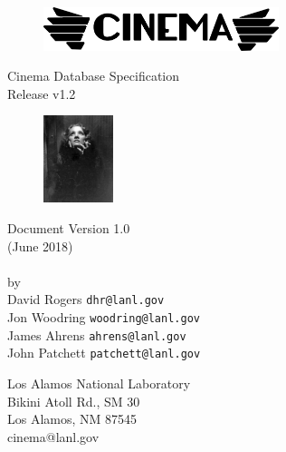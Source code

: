 \thispagestyle{empty}

\begin{ttfamily}
\begin{center}
 \ \ \\
\vspace{1.0 in}
\begin{figure}[h!]
\centering
\includegraphics[height=0.5in]{img/cinema_logo_name}
\end{figure}
\vspace{1.0 in}
Cinema Database Specification \\
\dietrich Release v1.2\\
\bigskip
\begin{figure}[h!]
\centering
\includegraphics[height=1.0in]{img/dietrich_spec_logo}
\end{figure}
\bigskip
Document Version 1.0 \\
(June 2018)\\
\LAUR\\
\bigskip
\bigskip
\bigskip
\bigskip
by \\
\bigskip
David Rogers  \texttt{\small dhr@lanl.gov}\\
Jon Woodring  \texttt{\small woodring@lanl.gov}\\
James Ahrens  \texttt{\small ahrens@lanl.gov}\\
John Patchett \texttt{\small patchett@lanl.gov}\\
\end{center}
\vspace{1.0 in}
\begin{flushright}
Los Alamos National Laboratory\\
Bikini Atoll Rd., SM 30\\
Los Alamos, NM 87545\\
cinema@lanl.gov\\
\end{flushright}
\end{ttfamily}
\newpage

\tableofcontents
\newpage

